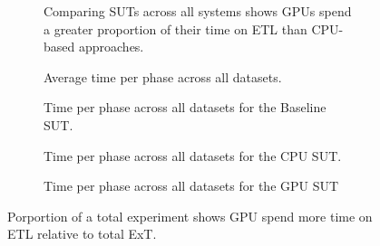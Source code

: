 \begin{figure}[htbp]

    \centering
    \begin{subfigure}[b]{\textwidth}
        \centering
        
        \caption{Comparing \acs{SUT}s across all systems shows \acs{GPU}s spend a greater proportion of their time on \acs{ETL} than \acs{CPU}-based approaches.}
        \label{Figure:exp-prop}
    \end{subfigure}


    \begin{minipage}[b]{0.45\textwidth}
        \centering
        \begin{subfigure}[b]{\textwidth}
            \centering
            
            \caption{Average time per phase across all datasets.}
            \label{fig:avg-prop}
        \end{subfigure}
        \vfill
        \begin{subfigure}[b]{\textwidth}
            \centering
            
            \caption{Time per phase across all datasets for the Baseline \acs{SUT}.}
            \label{Figure:baseline-prop}
        \end{subfigure}
    \end{minipage}
    \hfill
    \begin{minipage}[b]{0.45\textwidth}
        \centering
        \begin{subfigure}[b]{\textwidth}
            \centering
            
            \caption{Time per phase across all datasets for the \acs{CPU} \acs{SUT}.}
            \label{Figure:cpu-prop}
        \end{subfigure}
        \vfill
        \begin{subfigure}[b]{\textwidth}
            \centering
            
            \caption{Time per phase across all datasets for the \acs{GPU} \acs{SUT}}
            \label{fig:gpu-prop}
        \end{subfigure}
    \end{minipage}
    \caption{Porportion of a total experiment shows GPU spend more time on \acs{ETL} relative to total \ac{ExT}.}
    \label{Figure:proportions}

\end{figure}